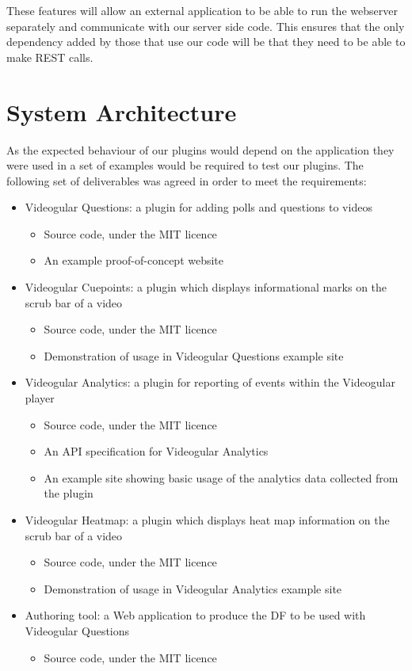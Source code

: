 These features will allow an external application to be able to run the webserver separately and communicate with our server side code. This ensures that the only dependency added by those that use our code will be that they need to be able to make \gls{REST} calls.

\section{System Architecture}

As the expected behaviour of our plugins would depend on the application they were used in a set of examples would be required to test our plugins. The following set of deliverables was agreed in order to meet the requirements:

\begin{itemize}
\item Videogular Questions: a plugin for adding polls and questions to videos
\begin{itemize}
\item Source code, under the MIT licence
\item An example proof-of-concept website
\end{itemize}
\item Videogular Cuepoints: a plugin which displays informational marks on the scrub bar of a video
\begin{itemize}
\item Source code, under the MIT licence
\item Demonstration of usage in Videogular Questions example site
\end{itemize}
\item Videogular Analytics: a plugin for reporting of events within the Videogular player
\begin{itemize}
\item Source code, under the MIT licence
\item An API specification for Videogular Analytics
\item An example site showing basic usage of the analytics data collected from the plugin
\end{itemize}
\item Videogular Heatmap: a plugin which displays heat map information on the scrub bar of a video
\begin{itemize}
\item Source code, under the MIT licence
\item Demonstration of usage in Videogular Analytics example site
\end{itemize}
\item Authoring tool: a Web application to produce the \gls{DF} to be used with Videogular Questions
\begin{itemize}
\item Source code, under the MIT licence
\end{itemize}
\end{itemize}

